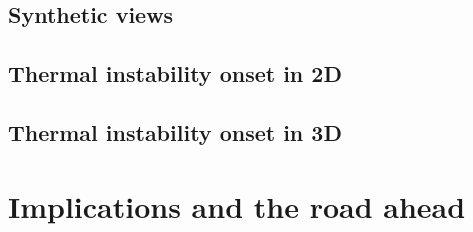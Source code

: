 \subsection{Synthetic views}
\subsection{Thermal instability onset in 2D}
\subsection{Thermal instability onset in 3D}

\section{Implications and the road ahead}
\cleardoublepage
